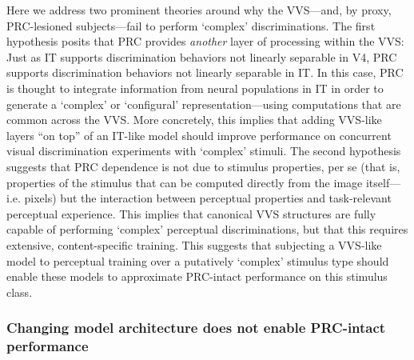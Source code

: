 \documentclass[11pt]{article}
\begin{document}
Here we address two prominent theories around why the VVS---and, by proxy, PRC-lesioned subjects---fail to perform `complex' discriminations. The first hypothesis posits that PRC provides \textit{another} layer of processing within the VVS\cite{murray1999perceptual}: Just as IT supports discrimination behaviors not linearly separable in V4, PRC supports discrimination behaviors not linearly separable in IT. In this case, PRC is thought to integrate information from neural populations in IT in order to generate a `complex' or `configural' representation---using computations that are common across the VVS. More concretely, this implies that adding VVS-like layers “on top” of an IT-like model should improve performance on concurrent visual discrimination experiments with `complex' stimuli. The second hypothesis suggests that PRC dependence is not due to stimulus properties, per se (that is, properties of the stimulus that can be computed directly from the image itself---i.e. pixels) but the interaction between perceptual properties and task-relevant perceptual experience\cite{liang2020experience}. This implies that canonical VVS structures are fully capable of performing `complex' perceptual discriminations, but that this requires extensive, content-specific training. This suggests that subjecting a VVS-like model to perceptual training over a putatively `complex' stimulus type should enable these models to approximate PRC-intact performance on this stimulus class. 

\subsubsection{Changing model architecture does not enable PRC-intact performance}
\end{document}
